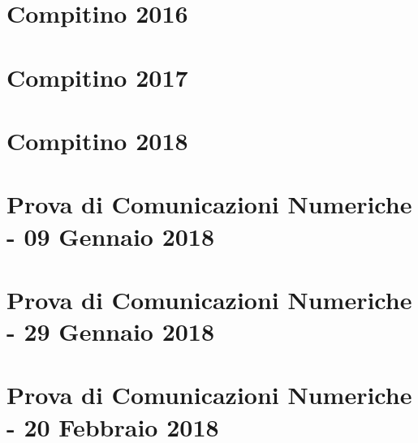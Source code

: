 \documentclass[12pt,oneside,openany]{memoir}
\numberwithin{equation}{subsection}
\begin{document}
\newpage
\section{Compitino 2016}


\newpage
\section{Compitino 2017}


\newpage
\section{Compitino 2018}


\newpage
\section{Prova di Comunicazioni Numeriche - 09 Gennaio 2018}


\newpage
\section{Prova di Comunicazioni Numeriche - 29 Gennaio 2018}


\newpage
\section{Prova di Comunicazioni Numeriche - 20 Febbraio 2018}
\end{document}
